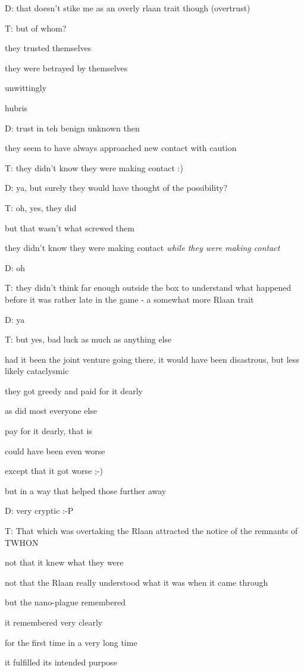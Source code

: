 D: that doesn't stike me as an overly rlaan trait though (overtrust)

T: but of whom?

they trusted themselves

they were betrayed by themselves

unwittingly

hubris

D: trust in teh benign unknown then

they seem to have always approached new contact with caution

T: they didn't know they were making contact :)

D: ya, but surely they would have thought of the possibility?

T: oh, yes, they did

but that wasn't what screwed them

they didn't know they were making contact {\em while they were making contact}

D: oh

T: they didn't think far enough outside the box to understand what happened before it was rather late in the game - a somewhat more Rlaan trait

D: ya

T: but yes, bad luck as much as anything else

had it been the joint venture going there, it would have been disastrous, but less likely cataclysmic

they got greedy and paid for it dearly

as did most everyone else

pay for it dearly, that is

could have been even worse

except that it got worse ;-)

but in a way that helped those further away

D: very cryptic :-P

T: That which was overtaking the Rlaan attracted the notice of the remnants of TWHON

not that it knew what they were

not that the Rlaan really understood what it was when it came through

but the nano-plague remembered

it remembered very clearly

for the first time in a very long time

it fulfilled its intended purpose

